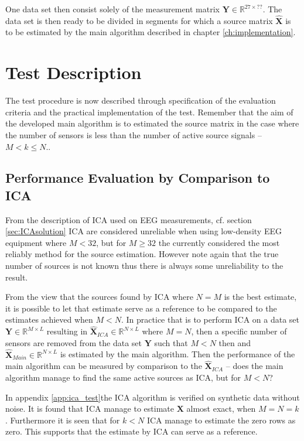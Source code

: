 One data set then consist solely of the measurement matrix $\mathbf{Y} \in \mathbb{R}^{27\times ??}$. The data set is then ready to be divided in segments for which a source matrix $\hat{\textbf{X}}$ is to be estimated by the main algorithm described in chapter \ref{ch:implementation}.

\section{Test Description}
The test procedure is now described through specification of the evaluation criteria and the practical implementation of the test.
Remember that the aim of the developed main algorithm is to estimated the source matrix in the case where the number of sensors is less than the number of active source signals -- $M<k\leq N.$.

\subsection{Performance Evaluation by Comparison to ICA}
From the description of ICA used on EEG measurements, cf. section \ref{sec:ICAsolution} ICA are considered unreliable when using low-density EEG equipment where $M<32$, but for $M\geq 32$ the currently considered the most reliably method for the source estimation. However note again that the true number of sources is not known thus there is always some unreliability to the result. 

From the view that the sources found by ICA where $N=M$ is the best estimate, it is possible to let that estimate serve as a reference to be compared to the estimates achieved when $M<N$. 
In practice that is to perform ICA on a data set $\textbf{Y}\in \mathbb{R}^{M \times L}$ resulting in $\hat{\textbf{X}}_{ICA}\in \mathbb{R}^{N\times L}$ where $M=N$, then a specific number of sensors are removed from the data set $\textbf{Y}$ such that $M<N$ then and $\hat{\textbf{X}}_{Main}\in \mathbb{R}^{N\times L}$ is estimated by the main algorithm. Then the performance of the main algorithm can be measured by comparison to the $\hat{\textbf{X}}_{ICA}$ -- does the main algorithm manage to find the same active sources as ICA, but for $M<N$?

In appendix \ref{app:ica_test}the ICA algorithm is verified on synthetic data without noise. It is found that ICA manage to estimate $\textbf{X}$ almost exact, when $M=N=k$. Furthermore it is seen that for $k < N$ ICA manage to estimate the zero rows as zero. This supports that the estimate by ICA can serve as a reference.     

